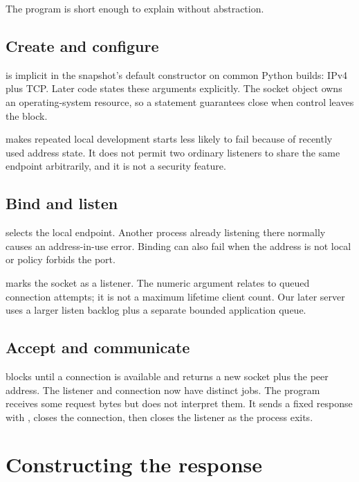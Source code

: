 
The program is short enough to explain without abstraction.

\subsection{Create and configure}

 is implicit in the snapshot's
default constructor on common Python builds: IPv4 plus TCP. Later code states
these arguments explicitly. The socket object owns an operating-system resource,
so a  statement guarantees close when control leaves the block.

 makes repeated local development starts less likely to fail
because of recently used address state. It does not permit two ordinary listeners
to share the same endpoint arbitrarily, and it is not a security feature.

\subsection{Bind and listen}

 selects the local endpoint. Another process already
listening there normally causes an address-in-use error. Binding can also fail
when the address is not local or policy forbids the port.

 marks the socket as a listener. The numeric argument relates to
queued connection attempts; it is not a maximum lifetime client count. Our later
server uses a larger listen backlog plus a separate bounded application queue.

\subsection{Accept and communicate}

 blocks until a connection is available and returns a new socket
plus the peer address. The listener and connection now have distinct jobs.
The program receives some request bytes but does not interpret them. It sends a
fixed response with , closes the connection, then closes the
listener as the process exits.

\section{Constructing the response}

